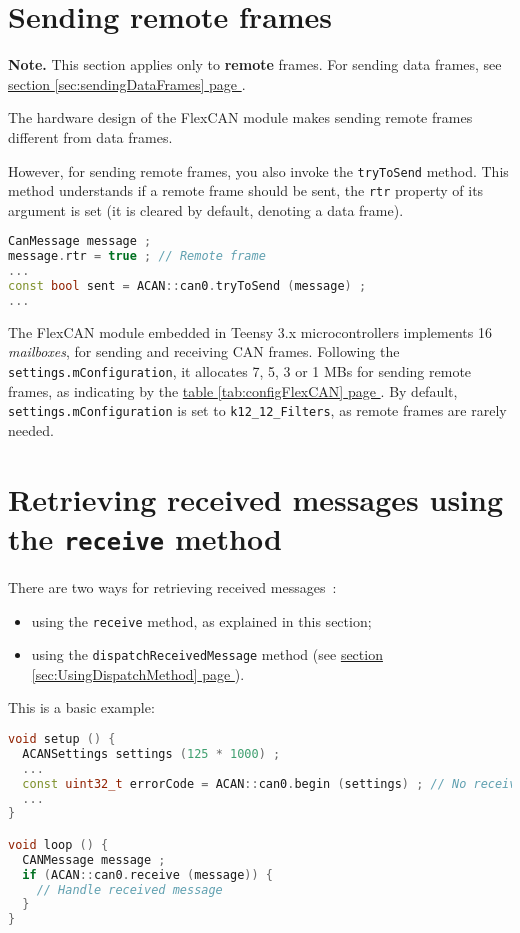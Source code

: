 \documentclass[9pt, a4paper, obeyspaces, openany]{extarticle}
\newcommand \sectionLabel[2]{\section{#1}\label{sec:#2}}
\newcommand\refSectionPage[1]{\hyperref[sec:#1]{section \ref*{sec:#1} page \pageref{sec:#1}}}
\newcommand\refTableauPage[1]{\hyperref[tab:#1]{table \ref*{tab:#1} page \pageref{tab:#1}}}
\begin{document}
\sectionLabel{Sending remote frames}{sendingRemoteFrames}

{\bf Note. } This section applies only to {\bf remote} frames. For sending data frames, see \refSectionPage{sendingDataFrames}.

The hardware design of the FlexCAN module makes sending remote frames different from data frames.

However, for sending remote frames, you also invoke the \texttt{tryToSend} method. This method understands if a remote frame should be sent, the \texttt{rtr} property of its argument is set (it is cleared by default, denoting a data frame).

{ \small\begin{lstlisting}[language=c++]
CanMessage message ;
message.rtr = true ; // Remote frame
... 
const bool sent = ACAN::can0.tryToSend (message) ;
...
\end{lstlisting}}

The FlexCAN module embedded in Teensy 3.x microcontrollers implements 16 \emph{mailboxes}, for sending and receiving CAN frames. Following the \texttt{settings.mConfiguration}, it allocates 7, 5, 3 or 1 MBs for sending remote frames, as indicating by the \refTableauPage{configFlexCAN}. By default, \texttt{settings.mConfiguration} is set to \texttt{k12\_12\_Filters}, as remote frames are rarely needed.





\sectionLabel{Retrieving received messages using the \texttt{receive} method}{UsingReceiveMethod}

There are two ways for retrieving received messages~:
\begin{itemize}
  \item using the \texttt{receive} method, as explained in this section;
  \item using the \texttt{dispatchReceivedMessage} method (see \refSectionPage{UsingDispatchMethod}).
\end{itemize}

This is a basic example:

{ \small\begin{lstlisting}[language=c++]
void setup () {
  ACANSettings settings (125 * 1000) ;
  ...
  const uint32_t errorCode = ACAN::can0.begin (settings) ; // No receive filter
  ...
}

void loop () {
  CANMessage message ;
  if (ACAN::can0.receive (message)) {
    // Handle received message
  }
}
\end{lstlisting}}
\end{document}
